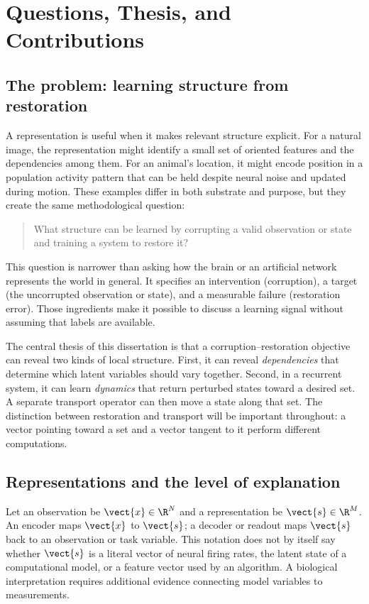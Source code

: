 \chapter{Questions, Thesis, and Contributions}
\label{chap:introduction}

\section{The problem: learning structure from restoration}
\label{sec:intro-problem}

A representation is useful when it makes relevant structure explicit. For a natural image, the representation might identify a small set of oriented features and the dependencies among them. For an animal's location, it might encode position in a population activity pattern that can be held despite neural noise and updated during motion. These examples differ in both substrate and purpose, but they create the same methodological question:

\begin{quote}
What structure can be learned by corrupting a valid observation or state and training a system to restore it?
\end{quote}

This question is narrower than asking how the brain or an artificial network represents the world in general. It specifies an intervention (corruption), a target (the uncorrupted observation or state), and a measurable failure (restoration error). Those ingredients make it possible to discuss a learning signal without assuming that labels are available.

The central thesis of this dissertation is that a corruption--restoration objective can reveal two kinds of local structure. First, it can reveal \emph{dependencies} that determine which latent variables should vary together. Second, in a recurrent system, it can learn \emph{dynamics} that return perturbed states toward a desired set. A separate transport operator can then move a state along that set. The distinction between restoration and transport will be important throughout: a vector pointing toward a set and a vector tangent to it perform different computations.

\section{Representations and the level of explanation}
\label{sec:intro-level}

Let an observation be $\vect{x}\in\R^N$ and a representation be $\vect{s}\in\R^M$. An encoder maps $\vect{x}$ to $\vect{s}$; a decoder or readout maps $\vect{s}$ back to an observation or task variable. This notation does not by itself say whether $\vect{s}$ is a literal vector of neural firing rates, the latent state of a computational model, or a feature vector used by an algorithm. A biological interpretation requires additional evidence connecting model variables to measurements.

